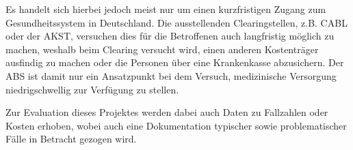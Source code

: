 Es handelt sich hierbei jedoch meist nur um einen kurzfristigen Zugang zum Gesundheitssystem in Deutschland. Die ausstellenden Clearingstellen, z.B. \ac{CABL} oder der \ac{AKST}, versuchen dies für die Betroffenen auch langfristig möglich zu machen, weshalb beim Clearing versucht wird, einen anderen Kostenträger ausfindig zu machen oder die Personen über eine Krankenkasse abzusichern. Der \acs{ABS} ist damit nur ein Ansatzpunkt bei dem Versuch, medizinische Versorgung niedrigschwellig zur Verfügung zu stellen.

Zur Evaluation dieses Projektes werden dabei auch Daten zu Fallzahlen oder Kosten erhoben, wobei auch eine Dokumentation typischer sowie problematischer Fälle in Betracht gezogen wird. \citep{Zanders.2022}
